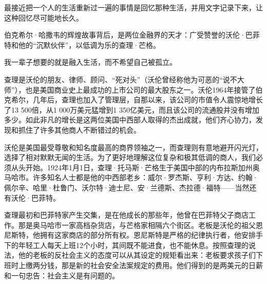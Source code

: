 \renewcommand{\bookchapter}{1}
\cleardoublepage
{}

\begin{WisdomBox}
\par

最接近把一个人的生活重新过一遍的事情是回忆那种生活，并用文字记录下来，让这种回忆尽可能地长久。
\par
\end{WisdomBox}

伯克希尔·哈撒韦的辉煌故事背后，是两位金融界的天才：广受赞誉的沃伦·巴菲特和他的“沉默伙伴”，以低调为乐的查理·芒格。
\par

\begin{WisdomBox}
\par

我一辈子想要的就是融入生活，而不希望自己被孤立。
\par
\end{WisdomBox}

查理是沃伦的朋友、律师、顾问、“死对头”（沃伦曾经称他为可恶的“说不大师”），也是美国商业史上最成功的上市公司的最大股东之一。沃伦1964年接管了伯克希尔，几年后，查理也加入了管理层，自那以来，该公司的市值令人震惊地增长了13 500倍，从1 000万美元猛增到1 350亿美元，而且该公司的流通股并没有增加多少。如此非凡的增长是这两位美国中西部人取得的杰出成就，他们齐心协力，发现和抓住了许多其他商人不断错过的机会。
\par

沃伦是美国最受尊敬和知名度最高的商界领袖之一，而查理则有意地避开闪光灯，选择了相对默默无闻的生活。为了更好地理解这位复杂和极其低调的商人，我们必须从头开始。1924年1月1日，查理·托马斯·芒格生于美国中部的内布拉斯加州奥马哈市。许多知名人士都是他的中西部老乡：威尔·罗杰斯、亨利·方达、约翰·佩尔辛、哈里·杜鲁门、沃尔特·迪士尼、安·兰德斯、杰拉德·福特——当然还有沃伦·巴菲特。
\par

查理最初和巴菲特家产生交集，是在他成长的那些年，他曾在巴菲特父子商店工作。那是奥马哈市一家高档杂货店，与芒格家相隔六个街区。老板是沃伦的祖父恩尼斯特，他拥有这家商店的部分所有权。恩尼斯特是严格的纪律执行者，他安排手下的年轻工人每天上班12个小时，其间既不能进食，也不能休息。按照查理的说法，他的老板的反社会主义的态度可以从其设定的规矩看出来：老板要求孩子们下班时上缴两分钱，那是新的社会安全法案规定的费用。他们得到的是两美元的日薪和一句忠告：社会主义是有问题的。
\par

